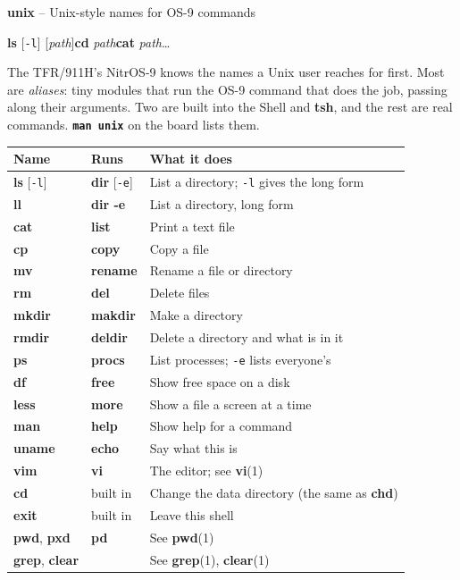 \documentclass[10pt,twoside,openany]{book}
\newcommand{\cmd}[1]{\textbf{#1}}            %
\newcommand{\var}[1]{\textit{#1}}            %
\newcommand{\rp}[2]{\textbf{#1}(#2)}         %
\newcommand{\type}[1]{\texttt{\textbf{#1}}}  %
\newenvironment{refpage}{%
  \begin{list}{}{%
    \setlength{\leftmargin}{1.3in}\setlength{\labelwidth}{1.2in}%
    \setlength{\labelsep}{0.1in}\setlength{\itemsep}{1.6ex}%
    \setlength{\parsep}{0.7ex}\setlength{\topsep}{0pt}\setlength{\listparindent}{0pt}%
    \renewcommand{\makelabel}[1]{\sffamily\bfseries ##1\hfil}}}%
  {\end{list}}
\newcommand{\rh}[1]{\item[#1]}
\begin{document}
\begin{refpage}
\rh{Name} \cmd{unix} -- Unix-style names for OS-9 commands
\rh{Syntax} \cmd{ls} [\texttt{-l}] [\var{path}]\quad \cmd{cd} \var{path}\quad \cmd{cat} \var{path}\quad \ldots
\rh{Description}
The TFR/911H's NitrOS-9 knows the names a Unix user reaches for first. Most
are \emph{aliases}: tiny modules that run the OS-9 command that does the
job, passing along their arguments. Two are built into the Shell and
\cmd{tsh}, and the rest are real commands. \type{man unix} on the board lists them.

\begin{tabularx}{\linewidth}{@{}l l X@{}}
\toprule
\textbf{Name} & \textbf{Runs} & \textbf{What it does}\\
\midrule
\cmd{ls} [\texttt{-l}] & \cmd{dir} [\texttt{-e}] & List a directory; \texttt{-l} gives the long form\\
\cmd{ll} & \cmd{dir -e} & List a directory, long form\\
\cmd{cat} & \cmd{list} & Print a text file\\
\cmd{cp} & \cmd{copy} & Copy a file\\
\cmd{mv} & \cmd{rename} & Rename a file or directory\\
\cmd{rm} & \cmd{del} & Delete files\\
\cmd{mkdir} & \cmd{makdir} & Make a directory\\
\cmd{rmdir} & \cmd{deldir} & Delete a directory and what is in it\\
\cmd{ps} & \cmd{procs} & List processes; \texttt{-e} lists everyone's\\
\cmd{df} & \cmd{free} & Show free space on a disk\\
\cmd{less} & \cmd{more} & Show a file a screen at a time\\
\cmd{man} & \cmd{help} & Show help for a command\\
\cmd{uname} & \cmd{echo} & Say what this is\\
\cmd{vim} & \cmd{vi} & The editor; see \rp{vi}{1}\\
\midrule
\cmd{cd} & built in & Change the data directory (the same as \cmd{chd})\\
\cmd{exit} & built in & Leave this shell\\
\midrule
\cmd{pwd}, \cmd{pxd} & \cmd{pd} & See \rp{pwd}{1}\\
\cmd{grep}, \cmd{clear} & & See \rp{grep}{1}, \rp{clear}{1}\\
\bottomrule
\end{tabularx}


\end{refpage}
\end{document}
